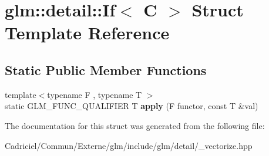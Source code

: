 \hypertarget{structglm_1_1detail_1_1_if}{}\section{glm\+:\+:detail\+:\+:If$<$ C $>$ Struct Template Reference}
\label{structglm_1_1detail_1_1_if}
\subsection*{Static Public Member Functions}
\begin{DoxyCompactItemize}
\item 
{\footnotesize template$<$typename F , typename T $>$ }\\static G\+L\+M\+\_\+\+F\+U\+N\+C\+\_\+\+Q\+U\+A\+L\+I\+F\+I\+ER T {\bfseries apply} (F functor, const T \&val)\hypertarget{structglm_1_1detail_1_1_if_ab66c77bac87f7ffe4aa6bb761b165746}{}\label{structglm_1_1detail_1_1_if_ab66c77bac87f7ffe4aa6bb761b165746}

\end{DoxyCompactItemize}


The documentation for this struct was generated from the following file\+:\begin{DoxyCompactItemize}
\item 
Cadriciel/\+Commun/\+Externe/glm/include/glm/detail/\+\_\+vectorize.\+hpp\end{DoxyCompactItemize}
